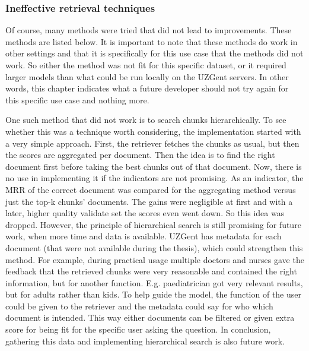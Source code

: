\subsubsection{Ineffective retrieval techniques}
Of course, many methods were tried that did not lead to improvements. These methods are listed below. It is important to note that these methods do work in other settings and that it is specifically for this use case that the methods did not work. So either the method was not fit for this specific dataset, or it required larger models than what could be run locally on the UZGent servers. In other words, this chapter indicates what a future developer should not try again for this specific use case and nothing more.

One such method that did not work is to search chunks hierarchically. To see whether this was a technique worth considering, the implementation started with a very simple approach. First, the retriever fetches the chunks as usual, but then the scores are aggregated per document. Then the idea is to find the right document first before taking the best chunks out of that document. Now, there is no use in implementing it if the indicators are not promising. As an indicator, the MRR of the correct document was compared for the aggregating method versus just the top-k chunks' documents. The gains were negligible at first and with a later, higher quality validate set the scores even went down. So this idea was dropped. However, the principle of hierarchical search is still promising for future work, when more time and data is available. UZGent has metadata for each document (that were not available during the thesis), which could strengthen this method. For example, during practical usage multiple doctors and nurses gave the feedback that the retrieved chunks were very reasonable and contained the right information, but for another function. E.g. paediatrician got very relevant results, but for adults rather than kids. To help guide the model, the function of the user could be given to the retriever and the metadata could say for who which document is intended. This way either documents can be filtered or given extra score for being fit for the specific user asking the question. In conclusion, gathering this data and implementing hierarchical search is also future work.

